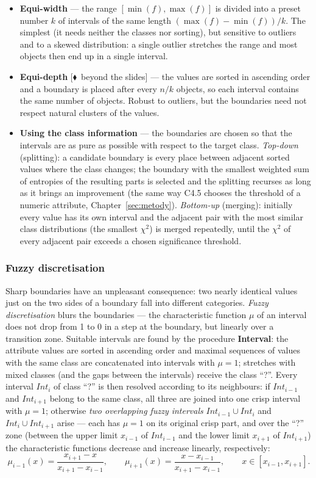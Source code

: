 \documentclass[11pt,a4paper]{article}
\theoremstyle{definition}
\providecommand{\uv}[1]{``#1''}
\newcommand{\mimo}{\textcolor{markcol}{\textsf{\footnotesize[$\blacklozenge$~beyond the slides]}}}
\begin{document}
\begin{itemize}
\item \textbf{Equi-width} --- the range $[\min(f),\max(f)]$ is divided into a preset number
      $k$ of intervals of the same length $(\max(f)-\min(f))/k$. The simplest (it needs
      neither the classes nor sorting), but sensitive to outliers and to a skewed
      distribution: a single outlier stretches the range and most objects then end up in a
      single interval.
\item \textbf{Equi-depth} \mimo{} --- the values are sorted in ascending order and a boundary
      is placed after every $n/k$ objects, so each interval contains the same number of
      objects. Robust to outliers, but the boundaries need not respect natural clusters of
      the values.
\item \textbf{Using the class information} --- the boundaries are chosen so that the intervals
      are as pure as possible with respect to the target class. \emph{Top-down} (splitting):
      a candidate boundary is every place between adjacent sorted values where the class
      changes; the boundary with the smallest weighted sum of entropies of the resulting
      parts is selected and the splitting recurses as long as it brings an improvement (the
      same way C4.5 chooses the threshold of a numeric attribute,
      Chapter~\ref{sec:metody}). \emph{Bottom-up} (merging): initially every value has its
      own interval and the adjacent pair with the most similar class distributions (the
      smallest $\chi^2$) is merged repeatedly, until the $\chi^2$ of every adjacent pair
      exceeds a chosen significance threshold.
\end{itemize}

\subsubsection{Fuzzy discretisation}

Sharp boundaries have an unpleasant consequence: two nearly identical values just on the two
sides of a boundary fall into different categories. \emph{Fuzzy discretisation} blurs the
boundaries --- the characteristic function $\mu$ of an interval does not drop from 1 to 0 in a
step at the boundary, but linearly over a transition zone. Suitable intervals are found by the
procedure \textbf{Interval}: the attribute values are sorted in ascending order and maximal
sequences of values with the same class are concatenated into intervals with $\mu=1$; stretches
with mixed classes (and the gaps between the intervals) receive the class \uv{?}. Every
interval $Int_i$ of class \uv{?} is then resolved according to its neighbours: if
$Int_{i-1}$ and $Int_{i+1}$ belong to the same class, all three are joined into one crisp
interval with $\mu=1$; otherwise \emph{two overlapping fuzzy intervals}
$Int_{i-1}\cup Int_i$ and $Int_i\cup Int_{i+1}$ arise --- each has $\mu=1$ on its original
crisp part, and over the \uv{?} zone (between the upper limit $x_{i-1}$ of $Int_{i-1}$ and the
lower limit $x_{i+1}$ of $Int_{i+1}$) the characteristic functions decrease and increase
linearly, respectively:
\[ \mu_{i-1}(x)=\frac{x_{i+1}-x}{x_{i+1}-x_{i-1}},\qquad
   \mu_{i+1}(x)=\frac{x-x_{i-1}}{x_{i+1}-x_{i-1}},\qquad x\in[x_{i-1},x_{i+1}]. \]
\end{document}
